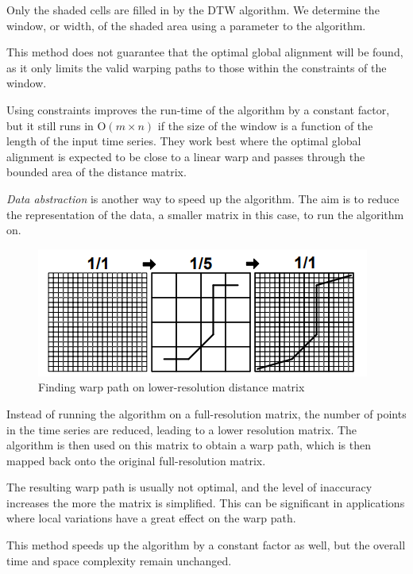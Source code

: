 \documentclass[final,rdr32.tex]{subfiles}
\begin{document}
Only the shaded cells are filled in by the DTW algorithm. We determine the window, or width, of the shaded area using a parameter to the algorithm.

This method does not guarantee that the optimal global alignment will be found, as it only limits the valid warping paths to those within the constraints of the window.

Using constraints improves the run-time of the algorithm by a constant factor, but it still runs in O$(m \times n)$ if the size of the window is a function of the length of the input time series. They work best where the optimal global alignment is expected to be close to a linear warp and passes through the bounded area of the distance matrix.


\textit{Data abstraction} \cite{chu2002iterative} is another way to speed up the algorithm. The aim is to reduce the representation of the data, a smaller matrix in this case, to run the algorithm on.

\begin{figure}[H]
    \begin{center}
        \includegraphics[scale=1]{images/data_abstraction.png}
        \caption{Finding warp path on lower-resolution distance matrix}
    \end{center}
\end{figure}

Instead of running the algorithm on a full-resolution matrix, the number of points in the time series are reduced, leading to a lower resolution matrix. The algorithm is then used on this matrix to obtain a warp path, which is then mapped back onto the original full-resolution matrix.

The resulting warp path is usually not optimal, and the level of inaccuracy increases the more the matrix is simplified. This can be significant in applications where local variations have a great effect on the warp path.

This method speeds up the algorithm by a constant factor as well, but the overall time and space complexity remain unchanged.
\end{document}
